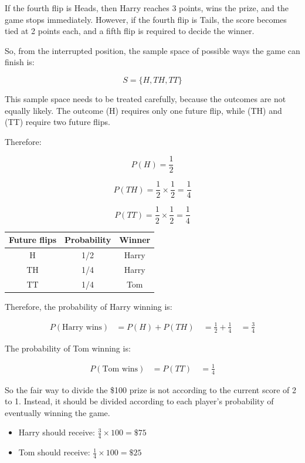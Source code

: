 \documentclass[
  letterpaper,
  DIV=11,
  numbers=noendperiod]{scrreprt}
\begin{document}
\begin{tcolorbox}
If the fourth flip is Heads, then Harry reaches 3 points, wins the
prize, and the game stops immediately. However, if the fourth flip is
Tails, the score becomes tied at 2 points each, and a fifth flip is
required to decide the winner.

So, from the interrupted position, the sample space of possible ways the
game can finish is:

\[
S = \{H,TH,TT\}
\]

This sample space needs to be treated carefully, because the outcomes
are not equally likely. The outcome (H) requires only one future flip,
while (TH) and (TT) require two future flips.

Therefore:

\[
P(H)=\frac{1}{2}
\]

\[
P(TH)=\frac{1}{2}\times\frac{1}{2}=\frac{1}{4}
\]

\[
P(TT)=\frac{1}{2}\times\frac{1}{2}=\frac{1}{4}
\]

\begin{table}
\fontsize{12.0pt}{14.0pt}\selectfont
\begin{tabular*}{\linewidth}{@{\extracolsep{\fill}}ccc}
\toprule
Future flips & Probability & Winner \\ 
\midrule\addlinespace[2.5pt]
H & 1/2 & Harry \\ 
TH & 1/4 & Harry \\ 
TT & 1/4 & Tom \\ 
\bottomrule
\end{tabular*}
\end{table}

Therefore, the probability of Harry winning is:

\[
\begin{aligned}
P(\text{Harry wins})
&= P(H) + P(TH) \
&= \frac{1}{2} + \frac{1}{4} \
&= \frac{3}{4}
\end{aligned}
\]

The probability of Tom winning is:

\[
\begin{aligned}
P(\text{Tom wins})
&= P(TT) \
&= \frac{1}{4}
\end{aligned}
\]

So the fair way to divide the \$100 prize is not according to the
current score of 2 to 1. Instead, it should be divided according to each
player's probability of eventually winning the game.

\begin{itemize}
\item
  Harry should receive: \(\frac{3}{4}\times 100 = \$75\)
\item
  Tom should receive: \(\frac{1}{4}\times 100 = \$25\)
\end{itemize}


\end{tcolorbox}
\end{document}
